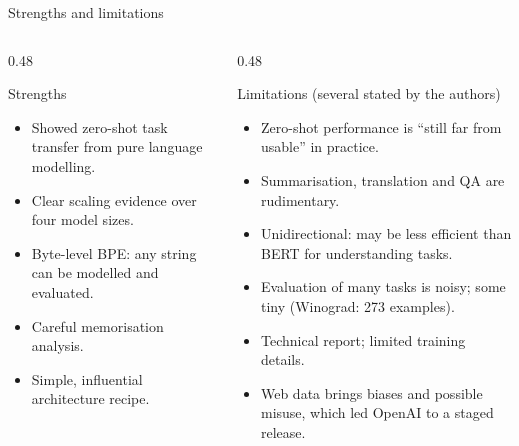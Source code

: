 \documentclass[aspectratio=169,11pt]{beamer}
\begin{document}
\begin{frame}{Strengths and limitations}
  \begin{columns}[T]
    \begin{column}{0.48\textwidth}
      \begin{exampleblock}{Strengths}
        \small
        \begin{itemize}
          \item Showed zero-shot task transfer from pure language modelling.
          \item Clear scaling evidence over four model sizes.
          \item Byte-level BPE: any string can be modelled and evaluated.
          \item Careful memorisation analysis.
          \item Simple, influential architecture recipe.
        \end{itemize}
      \end{exampleblock}
    \end{column}
    \begin{column}{0.48\textwidth}
      \begin{alertblock}{Limitations (several stated by the authors)}
        \small
        \begin{itemize}
          \item Zero-shot performance is ``still far from usable'' in practice.
          \item Summarisation, translation and QA are rudimentary.
          \item Unidirectional: may be less efficient than BERT for understanding tasks.
          \item Evaluation of many tasks is noisy; some tiny (Winograd: 273 examples).
          \item Technical report; limited training details.
          \item Web data brings biases and possible misuse, which led OpenAI to a staged release.
        \end{itemize}
      \end{alertblock}
    \end{column}
  \end{columns}
\end{frame}
\end{document}
